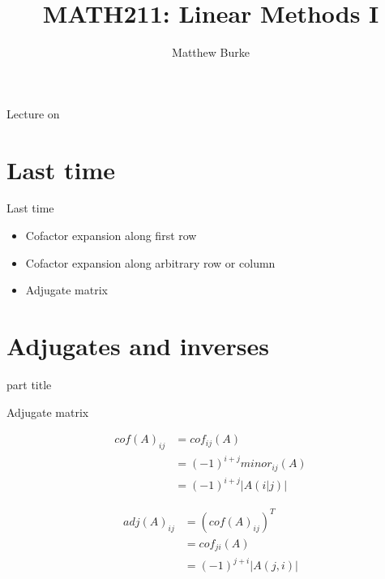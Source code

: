 \documentclass{beamer}
\title{MATH211: Linear Methods I}
\author{Matthew Burke}
\date{\lectureDate}
\newcommand{\lectureDate}{\formatdate{04}{10}{2018}}
\begin{document}
\frame{\titlepage}

\begin{frame}{Lecture on \lectureDate}
  \tableofcontents
\end{frame}

\section*{Last time}
\label{sec:Last-time}

\begin{frame}{Last time}
  \begin{itemize}
  \item Cofactor expansion along first row\vfill
  \item Cofactor expansion along arbitrary row or column\vfill
  \item Adjugate matrix
  \end{itemize}
\end{frame}

\section{Adjugates and inverses}

\begin{frame}
  \begin{beamercolorbox}[sep=12pt,center]{part title}
    \insertsection\par
  \end{beamercolorbox}
\end{frame}

\begin{frame}{Adjugate matrix}
  \begin{definition}
    \begin{align*}
      cof(A)_{ij} &= cof_{ij}(A)\\
                    &= (-1)^{i+j}minor_{ij}(A)\\
                    &= (-1)^{i+j}\left|A(i|j)\right|
    \end{align*}
  \end{definition}\vfill
  \begin{definition}
    \begin{align*}
      adj(A)_{ij} &= (cof(A)_{ij})^T\\
                  &= cof_{ji}(A)\\
                  &= (-1)^{j+i}\left|A(j, i)\right|
    \end{align*}
  \end{definition}
\end{frame}
\end{document}
